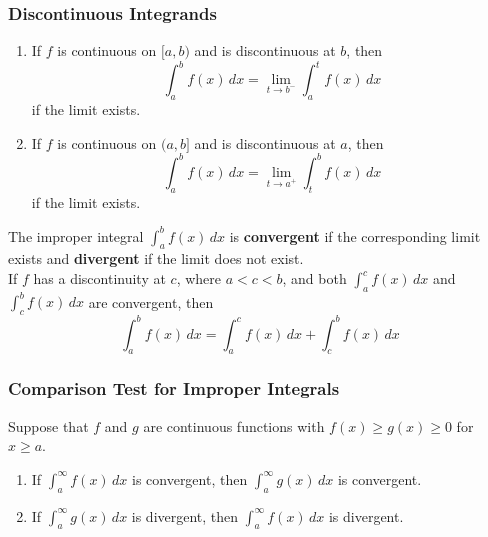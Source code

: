\subsubsection*{Discontinuous Integrands}
\begin{definition}
    \begin{enumerate}
        \item If \(f\) is continuous on \([a,b)\) and is discontinuous at
        \(b\), then
        \[\int_a^b f(x)\,dx=\lim_{t\to b^-}\int_a^t f(x)\,dx\]
        if the limit exists.
        \item If \(f\) is continuous on \((a,b]\) and is discontinuous at
        \(a\), then
        \[\int_a^b f(x)\,dx=\lim_{t\to a^+}\int_t^b f(x)\,dx\]
        if the limit exists.
    \end{enumerate}
    The improper integral \(\displaystyle{\int_a^b f(x)\,dx}\) is
    \textbf{convergent} if the corresponding limit exists and
    \textbf{divergent} if the limit does not exist. \\
    If \(f\) has a discontinuity at \(c\), where \(a<c<b\), and both
    \(\displaystyle{\int_a^c f(x)\,dx}\) and
    \(\displaystyle{\int_c^b f(x)\,dx}\) are convergent,
    then
    \[\int_a^b f(x)\,dx=\int_a^c f(x)\,dx+\int_c^b f(x)\,dx\]
\end{definition}

\subsubsection*{Comparison Test for Improper Integrals}
\begin{theorem}
    Suppose that \(f\) and \(g\) are continuous functions with
    \(f(x)\geq g(x)\geq 0\) for \(x\geq a\).
    \begin{enumerate}
        \item If \(\displaystyle{\int_a^\infty f(x)\,dx}\) is convergent, then
        \(\displaystyle{\int_a^\infty g(x)\,dx}\) is convergent.
        \item If \(\displaystyle{\int_a^\infty g(x)\,dx}\) is divergent, then
        \(\displaystyle{\int_a^\infty f(x)\,dx}\) is divergent.
    \end{enumerate}    
\end{theorem}